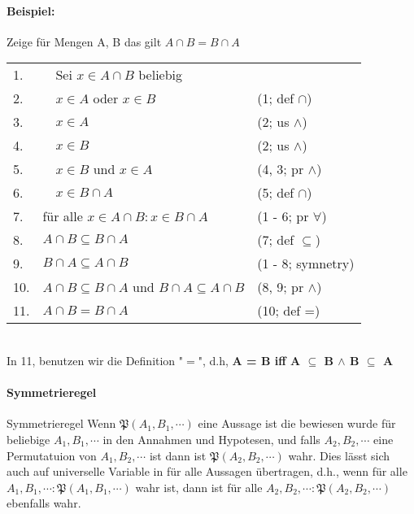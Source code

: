         \paragraph{Beispiel: }
            Zeige für Mengen A, B das gilt \(A \cap B = B \cap A\) \\
            \begin{tabular}{p{0.8cm}p{6cm}p{4cm}}
                1. & \(\quad \)Sei \( x \in A \cap B\) beliebig & \\
                2. & \(\quad\)\(x \in A\) oder \(x \in B\) & (1; def \(\cap\)) \\
                3. & \(\quad\)\(x \in A\) & (2; us \(\wedge\)) \\
                4. & \(\quad\)\(x \in B\) & (2; us \(\wedge\)) \\
                5. & \(\quad\)\(x \in B\) und \(x \in A\) & (4, 3; pr \(\wedge\)) \\
                6. & \(\quad\)\(x \in B \cap A\) & (5; def \(\cap\)) \\
                7. & für alle \(x \in A \cap B : x \in B \cap A\) & (1 - 6; pr \(\forall\)) \\
                8. & \(A \cap B \subseteq B \cap A\) & (7; def \(\subseteq\)) \\
                9. & \(B \cap A \subseteq A \cap B\) & (1 - 8; symnetry) \\
                10. & \(A \cap B \subseteq B \cap A\) und \(B \cap A \subseteq A \cap B\) & (8, 9; pr \(\wedge\)) \\
                11. & \(A \cap B = B \cap A\) & (10; def =) \\
            \end{tabular}
            \\
            In 11, benutzen wir die Definition "\(=\)", d.h, \textbf{A = B iff A \(\subseteq\) B \(\wedge\) B \(\subseteq\) A}
        \newpage
        \paragraph{Symmetrieregel}
        {
            Symmetrieregel
        }
        {
            Wenn \(\mathfrak{P}(A_1, B_1, \cdots)\) eine Aussage ist die bewiesen wurde für beliebige \(A_1, B_1, \cdots\) in den Annahmen und Hypotesen, und falls \(A_2, B_2, \cdots\) eine Permutatuion von \(A_1, B_2, \cdots\) ist dann ist \(\mathfrak{P}(A_2, B_2, \cdots)\) wahr. Dies lässt sich auch auf universelle Variable in für alle Aussagen übertragen, d.h., wenn für alle \(A_1, B_1, \cdots : \mathfrak{P}(A_1, B_1, \cdots)\) wahr ist, dann ist für alle \(A_2, B_2, \cdots : \mathfrak{P}(A_2, B_2, \cdots)\) ebenfalls wahr.
        }
